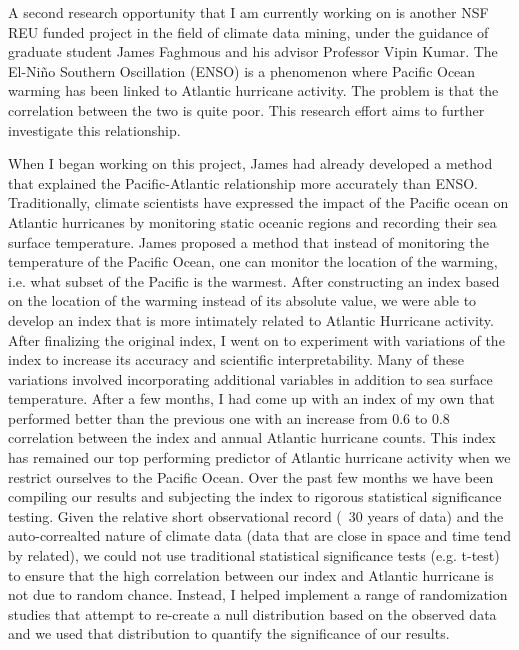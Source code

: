 \documentclass[a4paper,12pt]{article}
\begin{document}
A second research opportunity that I am currently working on is another NSF REU funded project in the field of climate data mining, under the guidance of graduate student James Faghmous and his advisor Professor Vipin Kumar. The El-Ni\~{n}o Southern Oscillation (ENSO) is a phenomenon where Pacific Ocean warming has been linked to Atlantic hurricane activity\cite{enso}.  The problem is that the correlation between the two is quite poor.  This research effort aims to further investigate this relationship. 

When I began working on this project, James had already developed a method that explained the Pacific-Atlantic relationship more accurately than ENSO. Traditionally, climate scientists 
have expressed the impact of the Pacific ocean on Atlantic hurricanes by monitoring static oceanic regions and recording their sea surface temperature. James proposed a method that instead of monitoring the temperature of the Pacific Ocean, one can monitor the location of the warming, i.e. what subset of the Pacific is the warmest. After constructing an index based on the location of the warming instead of its absolute value, we were able to develop an index that is more intimately related to Atlantic Hurricane activity. After finalizing the original index, I went on to experiment with variations of the index to increase its accuracy and scientific interpretability. Many of these variations involved incorporating additional variables in addition to sea surface temperature.  After a few months, I had come up with an index of my own that performed better than the previous one with an increase from 0.6 to 0.8 correlation between the index and annual Atlantic hurricane counts. This index has remained our top performing predictor of Atlantic hurricane activity when we restrict ourselves to the Pacific Ocean. Over the past few months we have been compiling our results and subjecting the index to rigorous statistical significance testing. Given the relative short observational record (~30 years of data) and the auto-correalted nature of climate data (data that are close in space and time tend by related), we could not use traditional statistical significance tests (e.g. t-test) to ensure that the high correlation between our index and Atlantic hurricane is not due to random chance. Instead, I helped implement a range of randomization studies that attempt to re-create a null distribution based on the observed data and we used that distribution to quantify the significance of our results.
\end{document}
